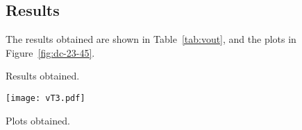\subsection{Results}
The results obtained are shown in Table~\ref{tab:vout}, and the plots in
Figure~\ref{fig:dc-23-45}.\\

\begin{minipage}[b]{0.48\textwidth}
  \centering
  
  \captionsetup{type=table}
  \caption{Results obtained.}
  \label{tab:vout}
\end{minipage}
\hfil
\begin{minipage}[b]{0.48\textwidth}
  \centering
  \texttt{[image: vT3.pdf]}
  \captionsetup{type=figure}
  \caption{Plots obtained.}
  \label{fig:dc-23-45}
\end{minipage}
